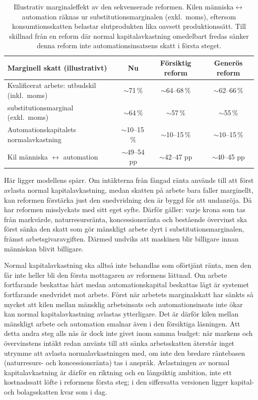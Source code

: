 \documentclass[11pt]{article}
\begin{document}
\begin{table}[h]
\small
\centering
\begin{tabular}{lccc}
\hline
\textbf{Marginell skatt (illustrativt)} & \textbf{Nu} & \textbf{Försiktig reform} & \textbf{Generös reform} \\
\hline
Kvalificerat arbete: utbudskil (inkl.\ moms) & $\sim$71\,\% & $\sim$64--68\,\% & $\sim$62--66\,\% \\
\quad substitutionsmarginal (exkl.\ moms) & $\sim$64\,\% & $\sim$57\,\% & $\sim$55\,\% \\
Automationskapitalets normalavkastning & $\sim$10--15\,\% & $\sim$10--15\,\% & $\sim$10--15\,\% \\
Kil människa $\leftrightarrow$ automation & $\sim$49--54 pp & $\sim$42--47 pp & $\sim$40--45 pp \\
\hline
\end{tabular}
\caption{Illustrativ marginaleffekt av den sekvenserade reformen. Kilen människa$\leftrightarrow$automation räknas ur substitutionsmarginalen (exkl.\ moms), eftersom konsumtionsskatten belastar slutprodukten lika oavsett produktionssätt. Till skillnad från en reform där normal kapitalavkastning omedelbart fredas sänker denna reform inte automationsinsatsens skatt i första steget.}
\label{tab:kilen}
\end{table}

Här ligger modellens spärr. Om intäkterna från fångad ränta används till att först avlasta normal kapitalavkastning, medan skatten på arbete bara faller marginellt, kan reformen förstärka just den snedvridning den är byggd för att undanröja. Då har reformen misslyckats med sitt eget syfte. Därför gäller: varje krona som tas från markvärde, naturresursränta, koncessionsränta och bestående övervinst ska först sänka den skatt som gör mänskligt arbete dyrt i substitutionsmarginalen, främst arbetsgivaravgiften. Därmed undviks att maskinen blir billigare innan människan blivit billigare.

Normal kapitalavkastning ska alltså inte behandlas som oförtjänt ränta, men den får inte heller bli den första mottagaren av reformens lättnad. Om arbete fortfarande beskattas hårt medan automationskapital beskattas lågt är systemet fortfarande snedvridet mot arbete. Först när arbetets marginalskatt har sänkts så mycket att kilen mellan mänsklig arbetsinsats och automationsinsats inte ökar kan normal kapitalavkastning avlastas ytterligare. Det är därför kilen mellan mänskligt arbete och automation smalnar även i den försiktiga läsningen. Att detta andra steg alls nås är dock inte givet inom samma budget: när markens och övervinstens intäkt redan använts till att sänka arbetsskatten återstår inget utrymme att avlasta normalavkastningen med, om inte den bredare räntebasen (naturresurs- och koncessionsränta) tas i anspråk. Avlastningen av normal kapitalavkastning är därför en riktning och en långsiktig ambition, inte ett kostnadssatt löfte i reformens första steg; i den siffersatta versionen ligger kapital- och bolagsskatten kvar som i dag.
\end{document}
